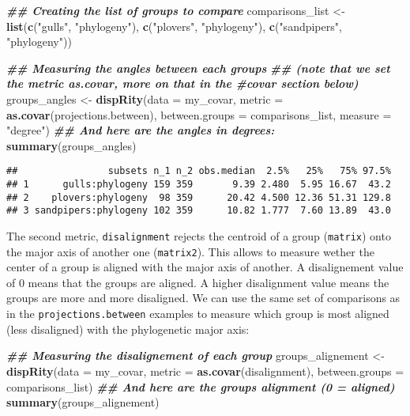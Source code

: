 \documentclass[
]{book}
\newenvironment{Shaded}{\begin{snugshade}}{\end{snugshade}}
\newcommand{\AttributeTok}[1]{\textcolor[rgb]{0.13,0.29,0.53}{#1}}
\newcommand{\DocumentationTok}[1]{\textcolor[rgb]{0.56,0.35,0.01}{\textbf{\textit{#1}}}}
\newcommand{\FunctionTok}[1]{\textcolor[rgb]{0.13,0.29,0.53}{\textbf{#1}}}
\newcommand{\NormalTok}[1]{#1}
\newcommand{\OtherTok}[1]{\textcolor[rgb]{0.56,0.35,0.01}{#1}}
\newcommand{\StringTok}[1]{\textcolor[rgb]{0.31,0.60,0.02}{#1}}
\begin{document}
\begin{Shaded}
\begin{Highlighting}[]
\DocumentationTok{\#\# Creating the list of groups to compare}
\NormalTok{comparisons\_list }\OtherTok{\textless{}{-}} \FunctionTok{list}\NormalTok{(}\FunctionTok{c}\NormalTok{(}\StringTok{"gulls"}\NormalTok{, }\StringTok{"phylogeny"}\NormalTok{),}
                         \FunctionTok{c}\NormalTok{(}\StringTok{"plovers"}\NormalTok{, }\StringTok{"phylogeny"}\NormalTok{),}
                         \FunctionTok{c}\NormalTok{(}\StringTok{"sandpipers"}\NormalTok{, }\StringTok{"phylogeny"}\NormalTok{))}

\DocumentationTok{\#\# Measuring the angles between each groups}
\DocumentationTok{\#\# (note that we set the metric as.covar, more on that in the \#covar section below)}
\NormalTok{groups\_angles }\OtherTok{\textless{}{-}} \FunctionTok{dispRity}\NormalTok{(}\AttributeTok{data =}\NormalTok{ my\_covar,}
                          \AttributeTok{metric =} \FunctionTok{as.covar}\NormalTok{(projections.between),}
                          \AttributeTok{between.groups =}\NormalTok{ comparisons\_list,}
                          \AttributeTok{measure =} \StringTok{"degree"}\NormalTok{)}
\DocumentationTok{\#\# And here are the angles in degrees:}
\FunctionTok{summary}\NormalTok{(groups\_angles)}
\end{Highlighting}
\end{Shaded}

\begin{verbatim}
##                subsets n_1 n_2 obs.median  2.5%   25%   75% 97.5%
## 1      gulls:phylogeny 159 359       9.39 2.480  5.95 16.67  43.2
## 2    plovers:phylogeny  98 359      20.42 4.500 12.36 51.31 129.8
## 3 sandpipers:phylogeny 102 359      10.82 1.777  7.60 13.89  43.0
\end{verbatim}

The second metric, \texttt{disalignment} rejects the centroid of a group (\texttt{matrix}) onto the major axis of another one (\texttt{matrix2}).
This allows to measure wether the center of a group is aligned with the major axis of another.
A disalignement value of 0 means that the groups are aligned. A higher disalignment value means the groups are more and more disaligned.
We can use the same set of comparisons as in the \texttt{projections.between} examples to measure which group is most aligned (less disaligned) with the phylogenetic major axis:

\begin{Shaded}
\begin{Highlighting}[]
\DocumentationTok{\#\# Measuring the disalignement of each group}
\NormalTok{groups\_alignement }\OtherTok{\textless{}{-}} \FunctionTok{dispRity}\NormalTok{(}\AttributeTok{data =}\NormalTok{ my\_covar,}
                              \AttributeTok{metric =} \FunctionTok{as.covar}\NormalTok{(disalignment),}
                              \AttributeTok{between.groups =}\NormalTok{ comparisons\_list)}
\DocumentationTok{\#\# And here are the groups alignment (0 = aligned)}
\FunctionTok{summary}\NormalTok{(groups\_alignement)}
\end{Highlighting}
\end{Shaded}
\end{document}
